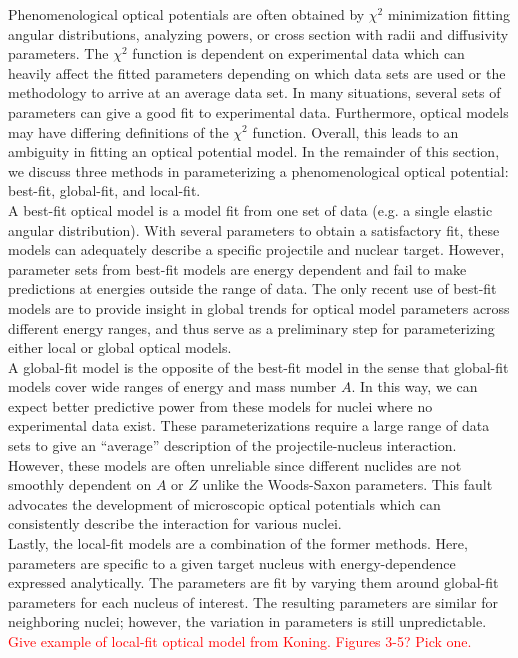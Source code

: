 \documentclass[preprintnumbers,floatfix,aps,prc,preprint,nofootinbib]{revtex4-1}
\begin{document}
Phenomenological optical potentials are often obtained by $\chi^2$ minimization fitting angular distributions, analyzing powers, or cross section with radii and diffusivity parameters. The $\chi^2$ function is dependent on experimental data which can heavily affect the fitted parameters depending on which data sets are used or the methodology to arrive at an average data set. In many situations, several sets of parameters can give a good fit to experimental data. Furthermore, optical models may have differing definitions of the $\chi^2$ function. Overall, this leads to an ambiguity in fitting an optical potential model. In the remainder of this section, we discuss three methods in parameterizing a phenomenological optical potential: best-fit, global-fit, and local-fit.
\\

A best-fit optical model is a model fit from one set of data (e.g. a single elastic angular distribution). With several parameters to obtain a satisfactory fit, these models can adequately describe a specific projectile and nuclear target. However, parameter sets from best-fit models are energy dependent and fail to make predictions at energies outside the range of data. The only recent use of best-fit models are to provide insight in global trends for optical model parameters across different energy ranges, and thus serve as a preliminary step for parameterizing either local or global optical models.
\\

A global-fit model is the opposite of the best-fit model in the sense that global-fit models cover wide ranges of energy and mass number $A$. In this way, we can expect better predictive power from these models for nuclei where no experimental data exist. These parameterizations require a large range of data sets to give an ``average'' description of the projectile-nucleus interaction. However, these models are often unreliable since different nuclides are not smoothly dependent on $A$ or $Z$ unlike the Woods-Saxon parameters. This fault advocates the development of microscopic optical potentials which can consistently describe the interaction for various nuclei.
\\

Lastly, the local-fit models are a combination of the former methods. Here, parameters are specific to a given target nucleus with energy-dependence expressed analytically. The parameters are fit by varying them around global-fit parameters for each nucleus of interest. The resulting parameters are similar for neighboring nuclei; however, the variation in parameters is still unpredictable. \textcolor{red}{Give example of local-fit optical model from Koning. Figures 3-5? Pick one.}
\\
\end{document}
